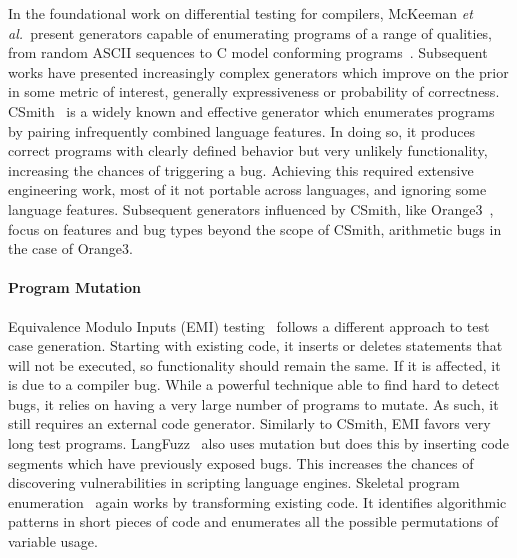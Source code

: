 In the foundational work on differential testing for compilers, McKeeman \emph{et al.\ }present generators capable of enumerating programs of a range of qualities, from random ASCII sequences to C model conforming programs~\cite{McKeeman1998}. Subsequent works have presented increasingly complex generators which improve on the prior in some metric of interest, generally expressiveness or probability of correctness. CSmith~\cite{Yang2011} is a widely known and effective generator which enumerates programs by pairing infrequently combined language features. In doing so, it produces correct programs with clearly defined behavior but very unlikely functionality, increasing the chances of triggering a bug. Achieving this required extensive engineering work, most of it not portable across languages, and ignoring some language features. Subsequent generators influenced by CSmith, like Orange3~\cite{Nagai2013}, focus on features and bug types beyond the scope of CSmith, arithmetic bugs in the case of Orange3.

\paragraph{Program Mutation}

Equivalence Modulo Inputs (EMI) testing~\cite{Le2013a,Sun2016a} follows a different approach to test case generation. Starting with existing code, it inserts or deletes statements that will not be executed, so functionality should remain the same. If it is affected, it is due to a compiler bug. While a powerful technique able to find hard to detect bugs, it relies on having a very large number of programs to mutate. As such, it still requires an external code generator. Similarly to CSmith, EMI favors very long test programs. LangFuzz~\cite{Holler2012} also uses mutation but does this by inserting code segments which have previously exposed bugs. This increases the chances of discovering vulnerabilities in scripting language engines. 
Skeletal program enumeration~\cite{Zhang2017a} again works by transforming existing code. It identifies algorithmic patterns in short pieces of code and enumerates all the possible permutations of variable usage.

